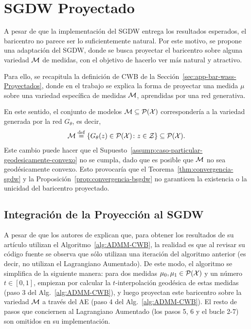 \section{SGDW Proyectado}\label{sec:sgdwp}  %

A pesar de que la implementación del SGDW entrega los resultados esperados, el baricentro no parece ser lo suficientemente natural. Por este motivo, se propone una adaptación del SGDW, donde se busca proyectar el baricentro sobre alguna variedad $\Manifold$ de medidas, con el objetivo de hacerlo ver más natural y atractivo.

Para ello, se recapitula la definición de CWB de la Sección~\ref{sec:app-bar-wass-Proyectados}, donde en el trabajo \cite{simon2020barycenters} se explica la forma de proyectar una medida $\mu$ sobre una variedad específica de medidas $\Manifold$, aprendidas por una red generativa.

En este sentido, el conjunto de modelos $\Manifold\subseteq \ProbSpace[\cX] $ correspondería a la variedad generada por la red $G_\theta$, es decir,
\begin{equation}
    \Manifold \eqdef \left\{ G_\theta(z) \in \ProbSpace[\cX] \colon z \in \cZ \right\} \subseteq \ProbSpace[\cX].
\end{equation}
Este cambio puede hacer que el Supuesto~\ref{assump:caso-particular-geodesicamente-convexo} no se cumpla, dado que es posible que $\Manifold$ no sea geodésicamente convexo. Esto provocaría que el Teorema~\ref{thm:convergencia-sgdw} y la Proposición~\ref{prop:convergencia-bsgdw} no garanticen la existencia o la unicidad del baricentro proyectado.





\subsection{Integración de la Proyección al SGDW}\label{ssec:sgdwp-deduccion-algoritmo}  %

A pesar de que los autores de \cite{simon2020barycenters} explican que, para obtener los resultados de su artículo utilizan el Algoritmo~\ref{alg:ADMM-CWB}, la realidad es que al revisar su código fuente \cite{imagebar2020simon} se observa que sólo utilizan una iteración del algoritmo anterior (es decir, no utilizan el Lagrangiano Aumentado). De este modo, el algoritmo se simplifica de la siguiente manera: para dos medidas $\mu_0, \mu_1 \in \ProbSpace[\cX] $ y un número $t \in [0, 1]$, empiezan por calcular la $t$-interpolación geodésica de estas medidas (paso 3 del Alg.~\ref{alg:ADMM-CWB}), y luego proyectan este baricentro sobre la variedad $\Manifold$ a través del AE (paso 4 del Alg.~\ref{alg:ADMM-CWB}). El resto de pasos que conciernen al Lagrangiano Aumentado (los pasos 5, 6 y el bucle 2-7) son omitidos en su implementación.

